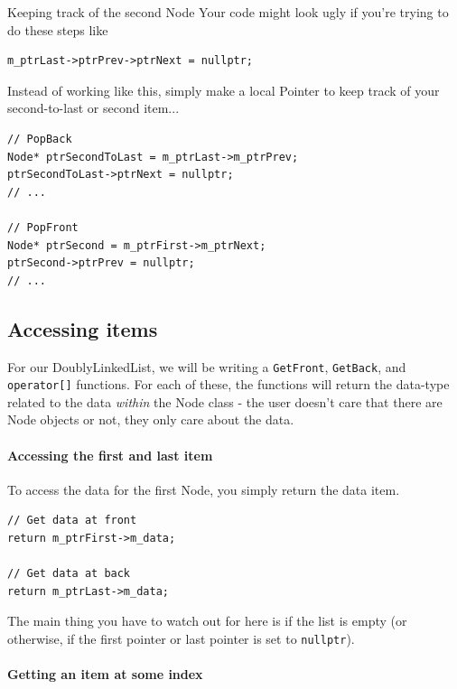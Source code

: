 \documentclass[a4paper,12pt,oneside]{book}
\begin{document}
            \begin{hint}{Keeping track of the second Node}
                Your code might look ugly if you're trying to do these steps like
\begin{verbatim}
m_ptrLast->ptrPrev->ptrNext = nullptr;
\end{verbatim}
                
                Instead of working like this, simply make a local Pointer
                to keep track of your second-to-last or second item...
                
\begin{verbatim}
// PopBack
Node* ptrSecondToLast = m_ptrLast->m_ptrPrev;
ptrSecondToLast->ptrNext = nullptr;
// ...

// PopFront
Node* ptrSecond = m_ptrFirst->m_ptrNext;
ptrSecond->ptrPrev = nullptr;
// ...
\end{verbatim}                
            \end{hint}
            
    \subsection{Accessing items}
    
        For our DoublyLinkedList, we will be writing a \texttt{GetFront},
        \texttt{GetBack}, and \texttt{operator[]} functions. For each
        of these, the functions will return the data-type related to the
        data \textit{within} the Node class - the user doesn't care that
        there are Node objects or not, they only care about the data.
        
        \paragraph{Accessing the first and last item}
        To access the data for the first Node, you simply return the data item.
        
\begin{lstlisting}[style=code]
// Get data at front
return m_ptrFirst->m_data;

// Get data at back
return m_ptrLast->m_data;
\end{lstlisting}

        The main thing you have to watch out for here is if the list
        is empty (or otherwise, if the first pointer or last pointer
        is set to \texttt{nullptr}).
    
        \paragraph{Getting an item at some index}
    
\end{document}
